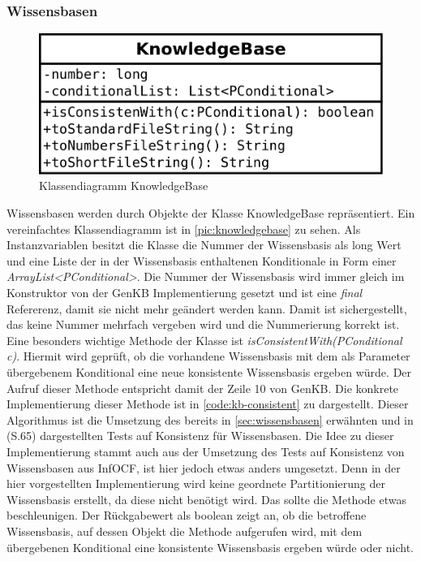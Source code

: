\documentclass[12pt,a4paper]{article}
\begin{document}
\subsubsection{Wissensbasen}



\begin{figure}
\includegraphics[width=0.45\linewidth]{bilder/KnowledgeBase.png}
\caption{Klassendiagramm KnowledgeBase}
\label{pic:knowledgebase}
\end{figure}



Wissensbasen werden durch Objekte der Klasse KnowledgeBase repräsentiert. Ein vereinfachtes Klassendiagramm ist in \autoref{pic:knowledgebase} zu sehen. Als Instanzvariablen besitzt die Klasse die Nummer der Wissensbasis als long Wert und eine Liste der in der Wissensbasis enthaltenen Konditionale in Form einer \textit{ArrayList<PConditional>}. Die Nummer der Wissensbasis wird immer gleich im Konstruktor von der GenKB Implementierung gesetzt und ist eine \textit{final} Refererenz, damit sie nicht mehr geändert werden kann. Damit ist sichergestellt, das keine Nummer mehrfach vergeben wird und die Nummerierung korrekt ist.\\
Eine besonders wichtige Methode der Klasse ist \textit{isConsistentWith(PConditional c)}. Hiermit wird geprüft, ob die vorhandene Wissensbasis mit dem als Parameter übergebenem Konditional eine neue konsistente Wissensbasis ergeben würde. Der Aufruf dieser Methode entspricht damit der Zeile 10 von GenKB. Die konkrete Implementierung dieser Methode ist in \autoref{code:kb-consistent} zu dargestellt. Dieser Algorithmus ist die Umsetzung des bereits in \autoref{sec:wissensbasen} erwähnten und in \cite{goldszmidt96}(S.65) dargestellten Tests auf Konsistenz für Wissensbasen.  Die Idee zu dieser Implementierung stammt auch aus der Umsetzung des Tests auf Konsistenz von Wissensbasen aus InfOCF, ist hier jedoch etwas anders umgesetzt. Denn in der hier vorgestellten Implementierung wird keine geordnete Partitionierung der Wissensbasis erstellt, da diese nicht benötigt wird. Das sollte die Methode etwas beschleunigen. Der Rückgabewert als boolean zeigt an, ob die betroffene Wissensbasis, auf dessen Objekt die Methode aufgerufen wird, mit dem übergebenen Konditional eine konsistente Wissensbasis ergeben würde oder nicht.
\end{document}
